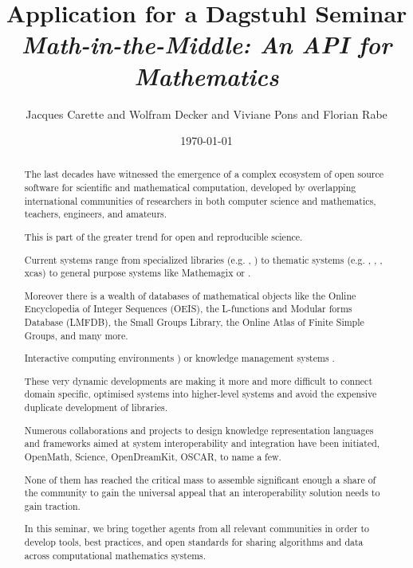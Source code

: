 \documentclass[a4paper,11pt]{article}
\title{Application for a Dagstuhl Seminar \\
  \emph{Math-in-the-Middle: An API for Mathematics}}
\author{Jacques Carette and Wolfram Decker and Viviane Pons and Florian Rabe}
\date{\today}
\begin{document}
\maketitle

\begin{abstract}

The last decades have witnessed the emergence of a complex ecosystem of open
source software for scientific and mathematical computation, developed by
overlapping international communities of researchers in both computer science
and mathematics, teachers, engineers, and amateurs.

This is part of the greater trend for open and reproducible science.

Current systems range from specialized libraries (e.g. \MPIR, \Linbox) to
thematic systems (e.g. \GAP, \Pari, \Singular, xcas) to general purpose systems
like Mathemagix or \Sage.

Moreover there is a wealth of databases of mathematical objects like the
Online Encyclopedia of Integer Sequences (OEIS), the L-functions and
Modular forms Database (LMFDB), the Small Groups Library, the Online Atlas of
Finite Simple Groups, and many more. 

Interactive computing environments \Jupyter) or knowledge management systems \MathHub.

These very dynamic developments are making it more and more difficult to connect
domain specific, optimised systems into higher-level systems and
avoid the expensive duplicate development of libraries.

Numerous collaborations and
projects to design knowledge representation languages and frameworks aimed at
system interoperability and integration have been initiated, OpenMath, Science,
OpenDreamKit, OSCAR, to name a few.

None of them has reached the critical mass to assemble
significant enough a share of the community to gain the universal appeal that an
interoperability solution needs to gain traction.

In this seminar, we bring together agents from all relevant communities in order
to develop tools, best practices, and open standards for sharing algorithms and
data across computational mathematics systems.
\end{abstract}
\end{document}
